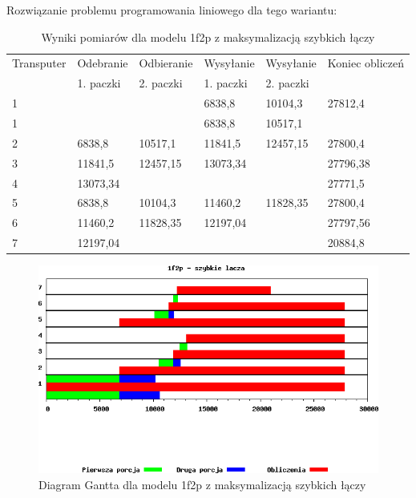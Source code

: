 \documentclass[a4paper,11pt, titlepage]{article}
\begin{document}
Rozwiązanie problemu programowania liniowego dla tego wariantu:
\begin{table}[hp!]
\begin{tabular}{|l|l|l|l|l|l|}\hline
Transputer&Odebranie&Odbieranie&Wysyłanie&Wysyłanie&Koniec obliczeń\\
&1. paczki&2. paczki&1. paczki&2. paczki&\\ \hline
1	&			&			&6838,8		&10104,3	&27812,4\\ \hline
1	&			&			&6838,8		&10517,1	&\\ \hline
2	&6838,8		&10517,1	&11841,5	&12457,15	&27800,4\\ \hline
3	&11841,5	&12457,15	&13073,34	&			&27796,38\\ \hline
4	&13073,34	&			&			&			&27771,5\\ \hline
5	&6838,8		&10104,3	&11460,2	&11828,35	&27800,4\\ \hline
6	&11460,2	&11828,35	&12197,04	&			&27797,56\\ \hline
7	&12197,04	&			&			&			&20884,8\\ \hline
\end{tabular}
\caption{Wyniki pomiarów dla modelu 1f2p z maksymalizacją szybkich łączy \label{1f2p_lt}}
\end{table}

\begin{figure}[htp!]
\includegraphics[width=1.0\textwidth]{wykresy/2p1f_lacza}
\caption{Diagram Gantta dla modelu 1f2p z maksymalizacją szybkich łączy \label{2p1f_l}}
\end{figure}
\end{document}
